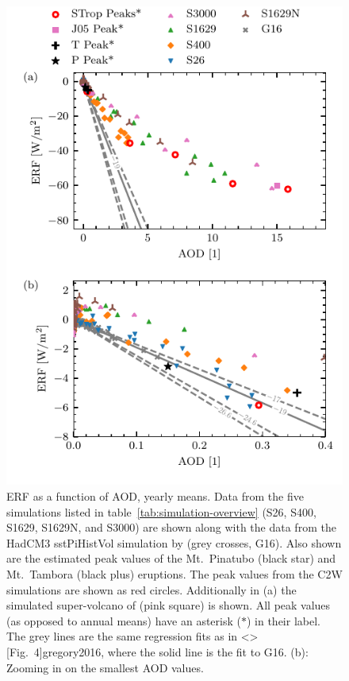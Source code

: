 \documentclass[draft]{agujournal2019}
\begin{document}
  \begin{figure}
    \centering \includegraphics{figure2}

    \caption{ERF as a function of AOD, yearly means. Data from the five simulations
      listed in table~\ref{tab:simulation-overview} (S26, S400, S1629, S1629N, and
      S3000) are shown along with the data from the HadCM3 sstPiHistVol simulation by
       (grey crosses, G16). Also shown are the estimated peak values
      of the Mt.\ Pinatubo (black star) and Mt.\ Tambora (black plus) eruptions. The
      peak values from the C2W simulations are shown as red circles. Additionally in (a)
      the simulated super-volcano of  (pink square) is shown. All peak
      values (as opposed to annual means) have an asterisk (\(\ast{}\)) in their label.
      The grey lines are the same regression fits as in \citeA<>[Fig.\
        4]{gregory2016}, where the solid line is the fit to G16. (b): Zooming in on the
      smallest AOD values.}\label{fig:2_rf_vs_aod_slopes}%
  \end{figure}
\end{document}
